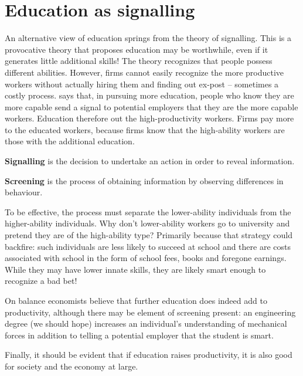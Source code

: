 \section{Education as signalling}\label{sec:ch13sec4}

An alternative view of education springs from the theory of signalling. This is a provocative theory that proposes education may be worthwhile, even if it generates little additional skills! The theory recognizes that people possess different abilities. However, firms cannot easily recognize the more productive workers without actually hiring them and finding out ex-post -- sometimes a costly process.  says that, in pursuing more education, people who know they are more capable send a signal to potential employers that they are the more capable workers. Education therefore  out the high-productivity workers. Firms pay more to the educated workers, because firms know that the high-ability workers are those with the additional education.

\begin{DefBox}
\textbf{Signalling} is the decision to undertake an action in order to reveal information.

\textbf{Screening} is the process of obtaining information by observing differences in behaviour.
\end{DefBox}

To be effective, the process must separate the lower-ability individuals from the higher-ability individuals. Why don't lower-ability workers go to university and pretend they are of the high-ability type? Primarily because that strategy could backfire: such individuals are less likely to succeed at school and there are costs associated with school in the form of school fees, books and foregone earnings. While they may have lower innate skills, they are likely smart enough to recognize a bad bet!

On balance economists believe that further education does indeed add to productivity, although there may be element of screening present: an engineering degree (we should hope) increases an individual's understanding of mechanical forces in addition to telling a potential employer that the student is smart.

Finally, it should be evident that if education raises productivity, it is also good for society and the economy at large.
